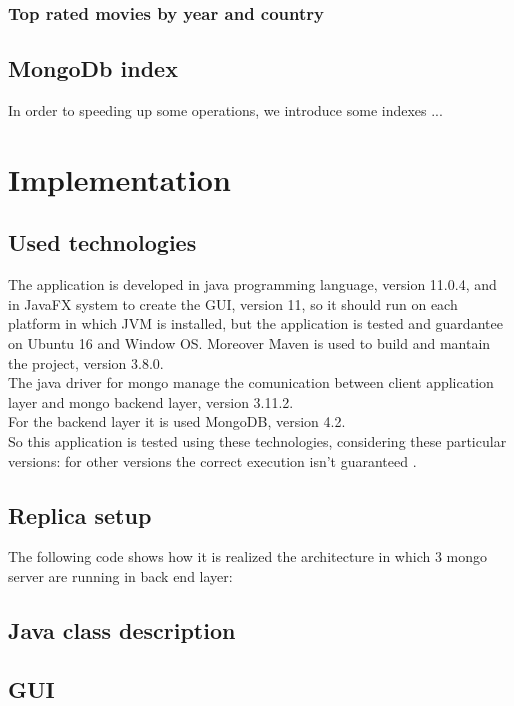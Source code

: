 \documentclass[a4paper, oneside]{article}
\begin{document}
\subsubsection{Top rated movies by year and country}

\subsection{MongoDb index}
In order to speeding up some operations, we introduce some indexes ...

\clearpage

\section{Implementation}
\subsection{Used technologies}
The application is developed in java programming language, version 11.0.4, and in JavaFX system to create the GUI, version 11, so it should run on each platform in which JVM is installed, but the application is tested and guardantee on Ubuntu 16 and Window OS. Moreover Maven is used  to build and mantain the project, version 3.8.0. \\
The java driver for mongo manage the comunication between client application layer and mongo backend layer, version 3.11.2.\\ 
For the backend layer it is used MongoDB, version 4.2.\\
So this application is tested using these technologies, considering these particular versions: for other versions the correct execution isn't guaranteed .\\

\subsection{Replica setup}
The following code shows how it is realized the architecture in which 3 mongo server are running in back end layer:
\vspace{2mm}

\vspace{5mm}
\subsection{Java class description}

\subsection{GUI}
\end{document}
